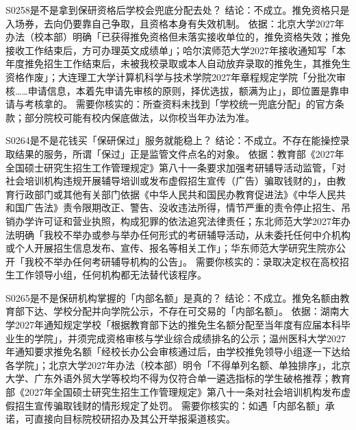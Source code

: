 \begin{qa}{S0258}{是不是拿到保研资格后学校会兜底分配去处？}
结论：不成立。推免资格只是入场券，去向仍要靠自己争取，且资格本身有失效机制。
依据：北京大学2027年办法（校本部）明确「已获得推免资格但未落实接收单位的，推免资格失效；推免接收工作结束后，方可办理英文成绩单」；哈尔滨师范大学2027年接收通知写「本年度推免招生工作结束后，未被我校录取或本人自动放弃录取的推免生，其推免生资格作废」；大连理工大学计算机科学与技术学院2027年章程规定学院「分批次审核……申请信息，本着先申请先审核的原则，择优选拔，额满为止」，即位置是靠申请与考核拿的。
需要你核实的：所查资料未找到「学校统一兜底分配」的官方条款；部分院校可能有校内保底做法，以你校当年办法为准。
\end{qa}

\begin{qa}{S0264}{是不是花钱买「保研保过」服务就能稳上？}
结论：不成立。不存在能操控录取结果的服务，所谓「保过」正是监管文件点名的对象。
依据：教育部《2027年全国硕士研究生招生工作管理规定》第八十一条要求加强考研辅导活动监管，「对社会培训机构违规开展辅导培训或发布虚假招生宣传（广告）骗取钱财的」，由教育行政部门或其他有关部门依据《中华人民共和国民办教育促进法》《中华人民共和国广告法》责令限期改正、警告、没收违法所得，情节严重的责令停止招生、吊销办学许可证和营业执照，构成犯罪的依法追究法律责任；东北师范大学2027年办法明确「我校不举办或参与举办任何形式的考研辅导活动，从未委托任何中介机构或个人开展招生信息发布、宣传、报名等相关工作」；华东师范大学研究生院亦公开「我校不举办任何考研辅导机构的公告」。
需要你核实的：录取决定权在高校招生工作领导小组，任何机构都无法替代该程序。
\end{qa}

\begin{qa}{S0265}{是不是保研机构掌握的「内部名额」是真的？}
结论：不成立。推免名额由教育部下达、学校分配并向学院公示，不存在可交易的「内部名额」。
依据：湖南大学2027年通知规定学校「根据教育部下达的推免生名额分配至当年度有应届本科毕业生的学院」，并须完成资格审核与学业综合成绩排名的公示；温州医科大学2027年通知要求推免名额「经校长办公会审核通过后，由学校推免领导小组逐一下达给各学院」；北京大学2027年办法（校本部）明令「不得单列名额、单独排序」，北京大学、广东外语外贸大学等校均不得为仅符合单一遴选指标的学生破格推荐；教育部《2027年全国硕士研究生招生工作管理规定》第八十一条对社会培训机构发布虚假招生宣传骗取钱财的情形规定了处罚。
需要你核实的：如遇「内部名额」承诺，可直接向目标院校研招办及其公开举报渠道核实。
\end{qa}

